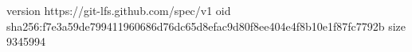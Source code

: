 version https://git-lfs.github.com/spec/v1
oid sha256:f7e3a59de799411960686d76dc65d8efac9d80f8ee404e4f8b10e1f87fc7792b
size 9345994
